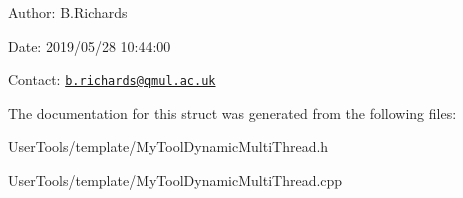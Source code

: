 \begin{DoxyParagraph}{Author\-:}
B.\-Richards 
\end{DoxyParagraph}
\begin{DoxyParagraph}{Date\-:}
2019/05/28 10\-:44\-:00 
\end{DoxyParagraph}
Contact\-: \href{mailto:b.richards@qmul.ac.uk}{\tt b.\-richards@qmul.\-ac.\-uk} 

The documentation for this struct was generated from the following files\-:\begin{DoxyCompactItemize}
\item 
User\-Tools/template/My\-Tool\-Dynamic\-Multi\-Thread.\-h\item 
User\-Tools/template/My\-Tool\-Dynamic\-Multi\-Thread.\-cpp\end{DoxyCompactItemize}

